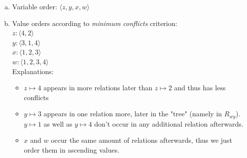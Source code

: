 \documentclass{article} %
\begin{document}
\begin{enumerate}[(a)]
    \item Variable order: $\langle z, y, x, w \rangle$

    \item Value orders according to \textit{minimum conflicts} criterion:\\[0.5em]
    $z: \langle 4, 2 \rangle$\\[0.5em]
    $y: \langle 3, 1, 4 \rangle$\\[0.5em]
    $x: \langle 1, 2, 3 \rangle$\\[0.5em]
    $w: \langle 1, 2, 3, 4 \rangle$\\[0.5em]
    Explanations:
    \begin{itemize}
        \item $z \mapsto 4$ appears in more relations later than $z \mapsto 2$ and thus
        has less conflicts
        \item $y \mapsto 3$ appears in one relation more, later in the "tree" (namely in $R_{wy}$).
        $y \mapsto 1$ as well as $y \mapsto 4$ don't occur in any additional relation afterwards.
        \item $x$ and $w$ occur the same amount of relations afterwards, thus we just
        order them in ascending values.
    \end{itemize}
    

\end{enumerate}
\end{document}
